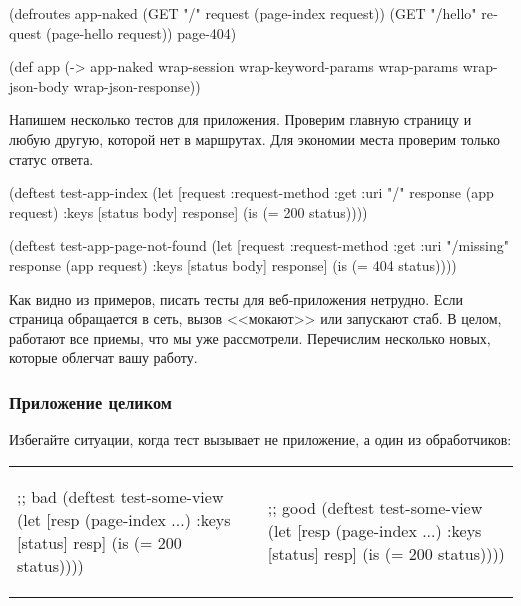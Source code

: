 \begin{english}
  \begin{clojure}
(defroutes app-naked
  (GET "/"      request (page-index request))
  (GET "/hello" request (page-hello request))
  page-404)

(def app
  (-> app-naked
      wrap-session
      wrap-keyword-params
      wrap-params
      wrap-json-body
      wrap-json-response))
  \end{clojure}
\end{english}

Напишем несколько тестов для приложения. Проверим главную страницу и любую
другую, которой нет в маршрутах. Для экономии места проверим только статус
ответа.

\begin{english}
  \begin{clojure}
(deftest test-app-index
  (let [request {:request-method :get :uri "/"}
        response (app request)
        {:keys [status body]} response]
    (is (= 200 status))))

(deftest test-app-page-not-found
  (let [request {:request-method :get :uri "/missing"}
        response (app request)
        {:keys [status body]} response]
    (is (= 404 status))))
  \end{clojure}
\end{english}

Как видно из примеров, писать тесты для веб-приложения нетрудно. Если страница
обращается в сеть, вызов <<мокают>> или запускают стаб. В целом, работают все
приемы, что мы уже рассмотрели. Перечислим несколько новых, которые облегчат
вашу работу.

\subsubsection*{Приложение целиком}

Избегайте ситуации, когда тест вызывает не приложение, а один из
обработчиков:

\noindent
\begin{tabular}{ @{}p{5.5cm} @{}p{5.2cm} }

\begin{english}
  \begin{clojure}
;; bad
(deftest test-some-view
  (let [resp (page-index {...})
        {:keys [status]} resp]
    (is (= 200 status))))
  \end{clojure}
\end{english}

&

\begin{english}
  \begin{clojure}
;; good
(deftest test-some-view
  (let [resp (page-index {...})
        {:keys [status]} resp]
    (is (= 200 status))))
  \end{clojure}
\end{english}

\end{tabular}

